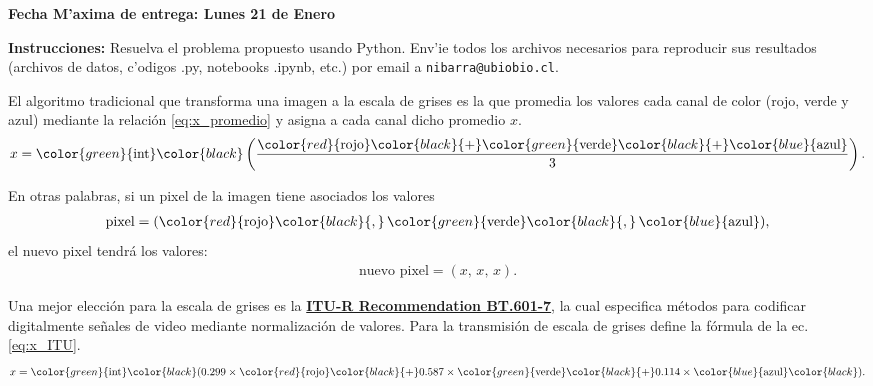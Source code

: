 \documentclass[11pt]{exam}
\begin{document}
\firstpageheadrule
\runningheadrule
{}
\cfoot{ }
\begin{flushleft}
\vspace{0.2in}
\vspace{0.25cm}
\end{flushleft}

\begin{center}
\textbf{Fecha M'axima de entrega: Lunes 21 de Enero}
\end{center}
\textbf{Instrucciones:} Resuelva el problema propuesto usando Python. Env'ie todos los archivos necesarios para reproducir sus resultados (archivos de datos, c'odigos .py, notebooks .ipynb, etc.) por email a \texttt{nibarra@ubiobio.cl}.

\bigskip
El algoritmo tradicional que transforma una imagen a la escala de grises es la que promedia los valores cada canal de color (rojo, verde y azul) mediante la relaci\'on \eqref{eq:x_promedio} y asigna a cada canal dicho promedio $x$.
\def \rojo{\color{red}{\text{rojo}}}
\def \verde{\color{green}{\text{verde}}}
\def \azul{\color{blue}{\text{azul}}}
\def \plus{\color{black}{+}}
\def \coma{\color{black}{,}}
\begin{align}
x = \color{green}{\text{int}} \color{black} 
\left(\frac{ \rojo \plus \verde \plus \azul}{3}\right). \label{eq:x_promedio}
\end{align}

En otras palabras, si un pixel de la imagen tiene asociados los valores
\begin{align}
\text{pixel} = (\rojo \coma\, \verde \coma\, \azul), 
\end{align}
el nuevo pixel tendr\'a los valores:
\begin{align}
\text{nuevo pixel} = (x,\, x,\, x).
\end{align}

Una mejor elecci\'on para la escala de grises es la \href{https://es.wikipedia.org/wiki/UIT-R_BT.601-7}{\textbf{ITU-R Recommendation BT.601-7}}, la cual especifica m\'etodos para codificar digitalmente se\~nales de video mediante normalizaci\'on de valores. Para la transmisi\'on de escala de grises define la f\'ormula de la ec. \eqref{eq:x_ITU}.
\begin{align}
x = \color{green}{\text{int}} \color{black}(0.299 \times \rojo \plus 0.587 \times \verde \plus 0.114 \times \azul \color{black}). \label{eq:x_ITU}
\end{align}
\end{document}

